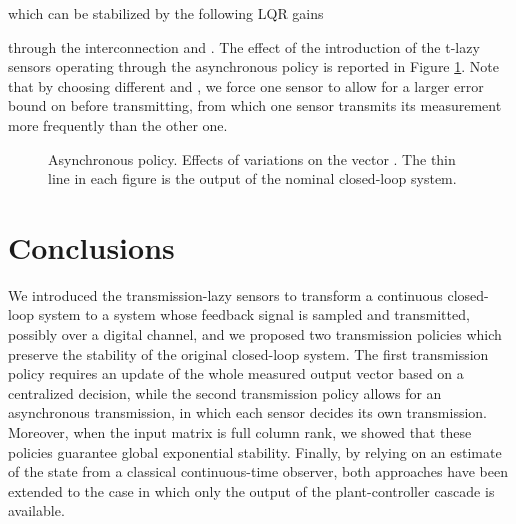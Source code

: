 \documentclass[twocolumn]{autart}
\begin{document}
which can be stabilized by the following LQR gains

through the interconnection  and .
The effect of the introduction of the t-lazy sensors operating
through the asynchronous policy is reported in Figure
\ref{figure_example2}.
Note that by choosing different  and ,
we force one sensor to allow for a larger error 
bound on  before transmitting, from which 
one sensor transmits its measurement   more frequently than
the other one. 


\begin{figure}[ht!]
\begin{center}
\caption{Asynchronous policy. Effects of variations on the vector .
The thin line in each figure is the output of the nominal closed-loop system.
} 
\label{figure_example2} 
\end{center}
\end{figure} 


\section{Conclusions}
\label{sec:conclusions}
We introduced the transmission-lazy sensors to transform a continuous closed-loop system
to a system whose feedback signal is sampled and transmitted, possibly over a 
{ digital channel},
and we proposed two transmission policies which preserve the stability of 
the original closed-loop system. The first transmission policy requires an
update of the whole measured output vector  based on a centralized decision,
while the second transmission policy allows for an asynchronous transmission,
in which each sensor decides its own transmission. Moreover, when the input matrix 
is full column rank, we showed that these policies guarantee global exponential stability.
Finally, by relying on an estimate of the state
from a classical continuous-time observer, 
both approaches have been extended to the case in which only the output 
of the plant-controller cascade is available.




\linespread{0.9}
\end{document}
